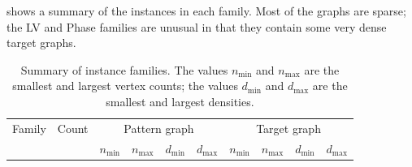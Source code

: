  shows a summary of the instances in each family.
Most of the graphs are sparse; the LV and Phase families are unusual in that they contain
some very dense target graphs.

\begin{table}[htb]
\centering
\footnotesize
    \begin{tabular}{lrrrrrrrrr}
 \toprule
        Family & Count & \multicolumn{4}{c}{Pattern graph} & \multicolumn{4}{c}{Target graph} \\
     \cmidrule(r){3-6}
     \cmidrule(r){7-10}
             & & $n_{\min{}}$ & $n_{\max{}}$ & $d_{\min{}}$ & $d_{\max{}}$
            & $n_{\min{}}$ & $n_{\max{}}$ & $d_{\min{}}$ & $d_{\max{}}$
            \\ [0.5ex]
 \midrule
        
 \bottomrule
\end{tabular}
    \caption{Summary of instance families. The values $n_{\min{}}$ and $n_{\max{}}$
            are the smallest and largest vertex counts; the values $d_{\min{}}$ and $d_{\max{}}$
            are the smallest and largest densities.}
\label{tab:instance-family-summary}
\end{table}

